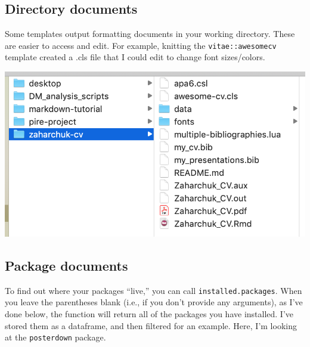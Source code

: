 \documentclass[
]{book}
\newenvironment{Shaded}{\begin{snugshade}}{\end{snugshade}}
\newcommand{\CommentTok}[1]{\textcolor[rgb]{0.56,0.35,0.01}{\textit{#1}}}
\newcommand{\DataTypeTok}[1]{\textcolor[rgb]{0.13,0.29,0.53}{#1}}
\newcommand{\DecValTok}[1]{\textcolor[rgb]{0.00,0.00,0.81}{#1}}
\newcommand{\KeywordTok}[1]{\textcolor[rgb]{0.13,0.29,0.53}{\textbf{#1}}}
\newcommand{\NormalTok}[1]{#1}
\newcommand{\OperatorTok}[1]{\textcolor[rgb]{0.81,0.36,0.00}{\textbf{#1}}}
\newcommand{\OtherTok}[1]{\textcolor[rgb]{0.56,0.35,0.01}{#1}}
\newcommand{\StringTok}[1]{\textcolor[rgb]{0.31,0.60,0.02}{#1}}
\begin{document}
\hypertarget{clsex}{%
\subsection{Directory documents}\label{clsex}}

Some templates output formatting documents in your working directory. These are easier to access and edit. For example, knitting the \texttt{vitae::awesomecv} template created a .cls file that I could edit to change font sizes/colors.

\includegraphics[width=11.78in]{images/template_dir}

\hypertarget{package-documents}{%
\subsection{Package documents}\label{package-documents}}

To find out where your packages ``live,'' you can call \texttt{installed.packages}. When you leave the parentheses blank (i.e., if you don't provide any arguments), as I've done below, the function will return all of the packages you have installed. I've stored them as a dataframe, and then filtered for an example. Here, I'm looking at the \texttt{posterdown} package.

\begin{Shaded}
\end{Shaded}
\end{document}
